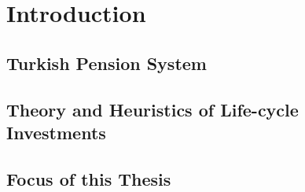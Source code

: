 \chapter{Introduction} %
\label{intro} %


\section{Turkish Pension System}
\section{Theory and Heuristics of Life-cycle Investments}
\section{Focus of this Thesis}
